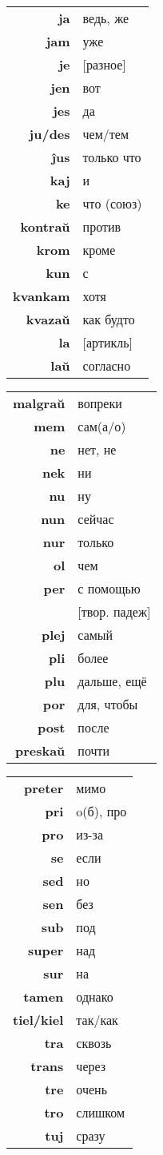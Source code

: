 \documentclass{article}
\begin{document}
\begin{tabular}{>{\bfseries}rl}
ja & ведь, же \\
jam & уже \\
je & {}[разное] \\
jen & вот \\
jes & да \\
ju/des & чем/тем \\
ĵus & только что \\
kaj & и \\
ke & что (союз) \\
kontraŭ & против \\
krom & кроме \\
kun & с \\
kvankam & хотя \\
kvazaŭ & как будто \\
la & {}[артикль] \\
laŭ & согласно \\
\end{tabular}
\begin{tabular}{>{\bfseries}rl}
malgraŭ & вопреки \\
mem & сам(а/о) \\
ne & нет, не \\
nek & ни \\
nu & ну \\
nun & сейчас \\
nur & только \\
ol & чем \\
per & с помощью \\
~ & {}[твор. падеж] \\
plej & самый \\
pli & более \\
plu & дальше, ещё \\
por & для, чтобы \\
post & после \\
preskaŭ & почти \\
\end{tabular}
\begin{tabular}{>{\bfseries}rl}
preter & мимо \\
pri & o(б), про \\
pro & из-за \\
se & если \\
sed & но \\
sen & без \\
sub & под \\
super & над \\
sur & на \\
tamen & однако \\
tiel/kiel & так/как \\
tra & сквозь \\
trans & через \\
tre & очень \\
tro & слишком \\
tuj & сразу \\
\end{tabular}
\end{document}
